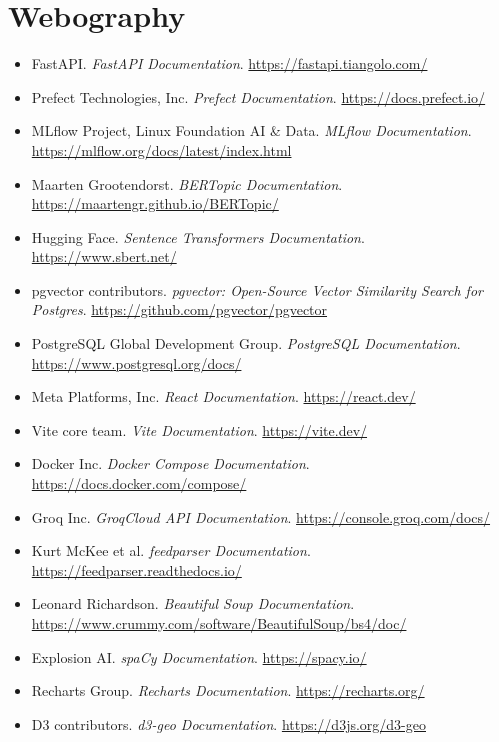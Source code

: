 \chapter*{Webography}

\begin{sloppypar}
\begin{itemize}
    \item FastAPI. \textit{FastAPI Documentation}. \url{https://fastapi.tiangolo.com/}
    \item Prefect Technologies, Inc. \textit{Prefect Documentation}. \url{https://docs.prefect.io/}
    \item MLflow Project, Linux Foundation AI \& Data. \textit{MLflow Documentation}. \url{https://mlflow.org/docs/latest/index.html}
    \item Maarten Grootendorst. \textit{BERTopic Documentation}. \url{https://maartengr.github.io/BERTopic/}
    \item Hugging Face. \textit{Sentence Transformers Documentation}. \url{https://www.sbert.net/}
    \item pgvector contributors. \textit{pgvector: Open-Source Vector Similarity Search for Postgres}. \url{https://github.com/pgvector/pgvector}
    \item PostgreSQL Global Development Group. \textit{PostgreSQL Documentation}. \url{https://www.postgresql.org/docs/}
    \item Meta Platforms, Inc. \textit{React Documentation}. \url{https://react.dev/}
    \item Vite core team. \textit{Vite Documentation}. \url{https://vite.dev/}
    \item Docker Inc. \textit{Docker Compose Documentation}. \url{https://docs.docker.com/compose/}
    \item Groq Inc. \textit{GroqCloud API Documentation}. \url{https://console.groq.com/docs/}
    \item Kurt McKee et al. \textit{feedparser Documentation}. \url{https://feedparser.readthedocs.io/}
    \item Leonard Richardson. \textit{Beautiful Soup Documentation}. \url{https://www.crummy.com/software/BeautifulSoup/bs4/doc/}
    \item Explosion AI. \textit{spaCy Documentation}. \url{https://spacy.io/}
    \item Recharts Group. \textit{Recharts Documentation}. \url{https://recharts.org/}
    \item D3 contributors. \textit{d3-geo Documentation}. \url{https://d3js.org/d3-geo}
\end{itemize}
\end{sloppypar}
